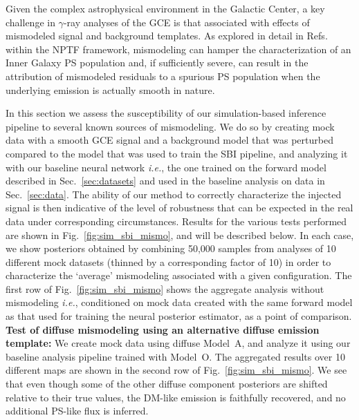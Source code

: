 \documentclass[prd,aps,10pt,nofootinbib,twocolumn,superscriptaddress,preprintnumbers,balancelastpage,longbibliography,floatfix]{revtex4-2}
\begin{document}
Given the complex astrophysical environment in the Galactic Center, a key challenge in $\gamma$-ray analyses of the GCE is that associated with effects of mismodeled signal and background templates. As explored in detail in Refs.~\cite{Lee:2015fea,Leane:2020pfc,Leane:2020nmi,Buschmann:2020adf,Chang:2019ars} within the NPTF framework, mismodeling can hamper the characterization of an Inner Galaxy PS population and, if sufficiently severe, can result in the attribution of mismodeled residuals to a spurious PS population when the underlying emission is actually smooth in nature. 

In this section we assess the susceptibility of our simulation-based inference pipeline to several known sources of mismodeling. We do so by creating mock data with a smooth GCE signal and a background model that was perturbed compared to the model that was used to train the SBI pipeline, and analyzing it with our baseline neural network \emph{i.e.}, the one trained on the forward model described in Sec.~\ref{sec:datasets} and used in the baseline analysis on data in Sec.~\ref{sec:data}. The ability of our method to correctly characterize the injected signal is then indicative of the level of robustness that can be expected in the real data under corresponding circumstances. Results for the various tests performed are shown in Fig.~\ref{fig:sim_sbi_mismo}, and will be described below. 
In each case, we show posteriors obtained by combining 50,000 samples from analyses of 10 different mock datasets (thinned by a corresponding factor of 10) in order to characterize the `average' mismodeling associated with a given configuration. The first row of Fig.~\ref{fig:sim_sbi_mismo} shows the aggregate analysis without mismodeling \emph{i.e.}, conditioned on mock data created with the same forward model as that used for training the neural posterior estimator, as a point of comparison. \\

\noindent
\textbf{Test of diffuse mismodeling using an alternative diffuse emission template:}
We create mock data using diffuse {Model~A}, and analyze it using our baseline analysis pipeline trained with {Model~O}. The aggregated results over 10 different maps are shown in the second row of Fig.~\ref{fig:sim_sbi_mismo}. We see that even though some of the other diffuse component posteriors are shifted relative to their true values, the DM-like emission is faithfully recovered, and no additional PS-like flux is inferred. \\
\end{document}
